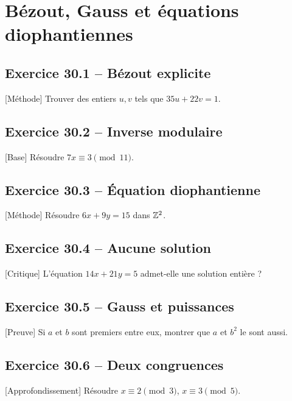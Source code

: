 \chapter{Bézout, Gauss et équations diophantiennes}
\section*{Exercice 30.1 -- Bézout explicite}
[Méthode] Trouver des entiers $u,v$ tels que $35u+22v=1$.

\section*{Exercice 30.2 -- Inverse modulaire}
[Base] Résoudre $7x\equiv3\pmod{11}$.

\section*{Exercice 30.3 -- Équation diophantienne}
[Méthode] Résoudre $6x+9y=15$ dans $\mathbb{Z}^2$.

\section*{Exercice 30.4 -- Aucune solution}
[Critique] L'équation $14x+21y=5$ admet-elle une solution entière ?

\section*{Exercice 30.5 -- Gauss et puissances}
[Preuve] Si $a$ et $b$ sont premiers entre eux, montrer que $a$ et $b^2$ le sont aussi.

\section*{Exercice 30.6 -- Deux congruences}
[Approfondissement] Résoudre $x\equiv2\pmod3$, $x\equiv3\pmod5$.
